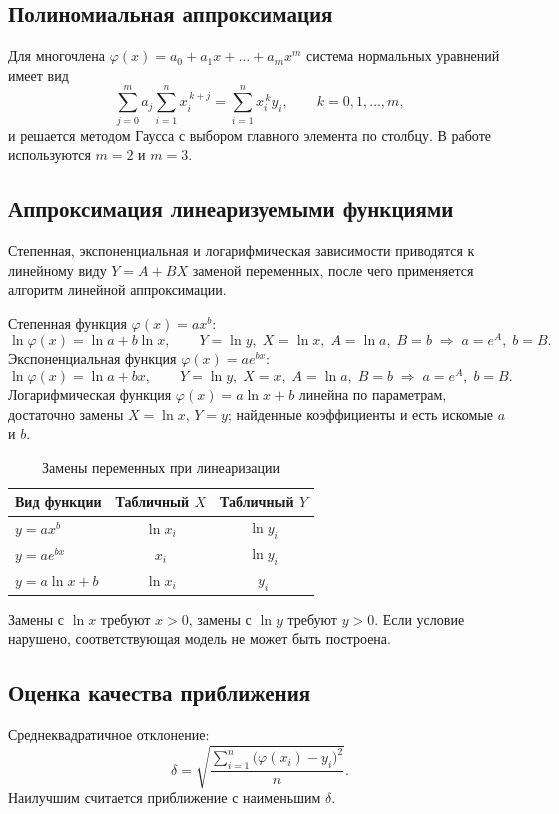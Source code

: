 \documentclass[12pt,a4paper]{article}
\begin{document}
\subsection*{Полиномиальная аппроксимация}
Для многочлена $\varphi(x)=a_0+a_1x+\ldots+a_mx^m$ система нормальных уравнений имеет вид
\[
    \sum_{j=0}^{m}a_j\sum_{i=1}^{n}x_i^{\,k+j}=\sum_{i=1}^{n}x_i^{\,k}y_i,\qquad k=0,1,\ldots,m,
\]
и решается методом Гаусса с выбором главного элемента по столбцу. В работе используются $m=2$ и $m=3$.

\subsection*{Аппроксимация линеаризуемыми функциями}
Степенная, экспоненциальная и логарифмическая зависимости приводятся к линейному виду $Y=A+BX$ заменой переменных, после чего применяется алгоритм линейной аппроксимации.

Степенная функция $\varphi(x)=ax^b$:
\[
    \ln\varphi(x)=\ln a+b\ln x,\qquad Y=\ln y,\; X=\ln x,\; A=\ln a,\; B=b
    \;\Longrightarrow\; a=e^{A},\; b=B.
\]
Экспоненциальная функция $\varphi(x)=ae^{bx}$:
\[
    \ln\varphi(x)=\ln a+bx,\qquad Y=\ln y,\; X=x,\; A=\ln a,\; B=b
    \;\Longrightarrow\; a=e^{A},\; b=B.
\]
Логарифмическая функция $\varphi(x)=a\ln x+b$ линейна по параметрам, достаточно замены $X=\ln x$, $Y=y$; найденные коэффициенты и есть искомые $a$ и $b$.

\begin{table}[H]
    \centering
    \caption{Замены переменных при линеаризации}
    \begin{tabular}{lcc}
        \toprule
        Вид функции & Табличный $X$ & Табличный $Y$\\
        \midrule
        $y=ax^b$ & $\ln x_i$ & $\ln y_i$\\
        $y=ae^{bx}$ & $x_i$ & $\ln y_i$\\
        $y=a\ln x+b$ & $\ln x_i$ & $y_i$\\
        \bottomrule
    \end{tabular}
\end{table}

Замены с $\ln x$ требуют $x>0$, замены с $\ln y$ требуют $y>0$. Если условие нарушено, соответствующая модель не может быть построена.

\subsection*{Оценка качества приближения}
Среднеквадратичное отклонение:
\[
    \delta=\sqrt{\frac{\sum_{i=1}^{n}\bigl(\varphi(x_i)-y_i\bigr)^2}{n}} .
\]
Наилучшим считается приближение с наименьшим $\delta$.
\end{document}
